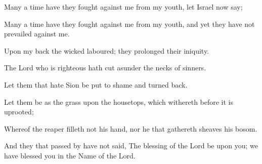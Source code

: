 Many a time have they fought against me from my youth, let Israel now say;

Many a time have they fought against me from my youth, and yet they have not prevailed against me.

Upon my back the wicked laboured; they prolonged their iniquity.

The Lord who is righteous hath cut asunder the necks of sinners.

Let them that hate Sion be put to shame and turned back.

Let them be as the grass upon the housetops, which withereth before it is uprooted;

Whereof the reaper filleth not his hand, nor he that gathereth sheaves his bosom.

And they that passed by have not said, The blessing of the Lord be upon you; we have blessed you in the Name of the Lord.
